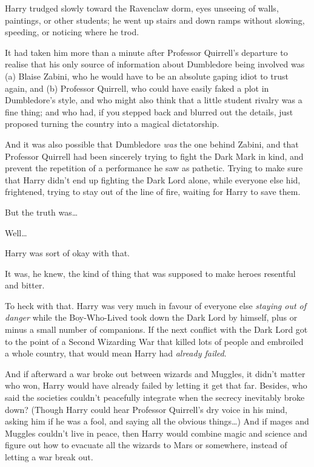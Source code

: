 Harry trudged slowly toward the Ravenclaw dorm, eyes unseeing of walls,
paintings, or other students; he went up stairs and down ramps without
slowing, speeding, or noticing where he trod.

It had taken him more than a minute after Professor Quirrell's departure
to realise that his only source of information about Dumbledore being
involved was (a) Blaise Zabini, who he would have to be an absolute
gaping idiot to trust again, and (b) Professor Quirrell, who could have
easily faked a plot in Dumbledore's style, and who might also think that
a little student rivalry was a fine thing; and who had, if you stepped
back and blurred out the details, just proposed turning the country into
a magical dictatorship.

And it was also possible that Dumbledore \emph{was} the one behind
Zabini, and that Professor Quirrell had been sincerely trying to fight
the Dark Mark in kind, and prevent the repetition of a performance he
saw as pathetic. Trying to make sure that Harry didn't end up fighting
the Dark Lord alone, while everyone else hid, frightened, trying to stay
out of the line of fire, waiting for Harry to save them.

But the truth was\ldots{}

Well\ldots{}

Harry was sort of okay with that.

It was, he knew, the kind of thing that was supposed to make heroes
resentful and bitter.

To heck with that. Harry was very much in favour of everyone else
\emph{staying out of danger} while the Boy-Who-Lived took down the Dark
Lord by himself, plus or minus a small number of companions. If the next
conflict with the Dark Lord got to the point of a Second Wizarding War
that killed lots of people and embroiled a whole country, that would
mean Harry had \emph{already failed}.

And if afterward a war broke out between wizards and Muggles, it didn't
matter who won, Harry would have already failed by letting it get that
far. Besides, who said the societies couldn't peacefully integrate when
the secrecy inevitably broke down? (Though Harry could hear Professor
Quirrell's dry voice in his mind, asking him if he was a fool, and
saying all the obvious things\ldots{}) And if mages and Muggles couldn't
live in peace, then Harry would combine magic and science and figure out
how to evacuate all the wizards to Mars or somewhere, instead of letting
a war break out.


